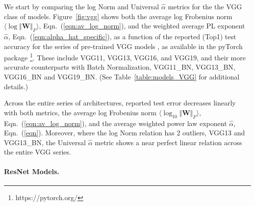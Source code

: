 We start by comparing the log Norm and Universal $\hat{\alpha}$ metrics for the  the VGG class of models.
Figure~\ref{fig:vgg} shows both the average log Frobenius norm
$\langle\log\Vert\mathbf{W}\Vert_{F}\rangle$,  Eqn.~(\ref{eqn:av_log_norm}),
and the weighted average PL exponent $\hat{\alpha}$,   Eqn.~(\ref{eqn:alpha_hat_specific}),
as a function of the reported (Top1) test accuracy for the series of pre-trained VGG models ,
as available in the pyTorch package
\footnote{https://pytorch.org/}. 
These include VGG11, VGG13, VGG16, and VGG19, and
their more accurate counterparts with Batch Normalization, VGG11\_BN, VGG13\_BN, VGG16\_BN and VGG19\_BN.  
(See Table~\ref{table:models_VGG} for additional details.)

Across the entire series of architectures, reported test error decreases linearly with both metrics, the 
average log Frobenius norm $\langle\log_{10}\Vert\mathbf{W}\Vert_{F}\rangle$, Eqn.~(\ref{eqn:av_log_norm}), 
and the  average weighted power law exponent $\hat{\alpha}$,  Eqn.~(\ref{eqn}).
Moreover, where the log Norm relation has 2 outliers, VGG13 and VGG13\_BN, 
the Universal $\hat{\alpha}$ metric shows a near perfect linear relation across the entire VGG series.

\paragraph{ResNet Models.}

